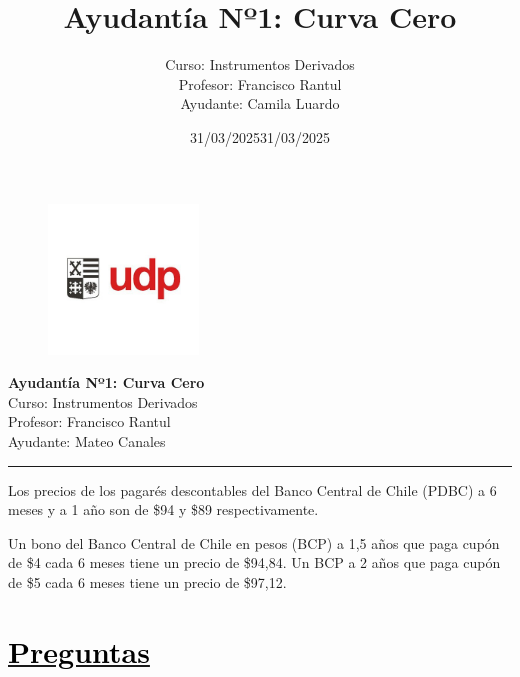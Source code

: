 \documentclass[12pt]{article}
\title{Ayudantía Nº1: Curva Cero}
\author{Curso: Instrumentos Derivados\\
Profesor: Francisco Rantul\\
Ayudante: Camila Luardo}
\date{31/03/2025}
\newcommand{\subrayadoRojo}[1]{{\color{rojoudp}\underline{\textcolor{black}{#1}}}}
\begin{document}
\begin{figure}
    \vspace{-5em}    
    \flushright
    \includegraphics[height=4cm]{../imagenes/logo.png}\\[-3em]
\end{figure}
\begin{center}
    {\LARGE \textbf{Ayudantía Nº1: Curva Cero}}\\[0.5em]
    Curso: Instrumentos Derivados\\
    Profesor: Francisco Rantul\\
    Ayudante: Mateo Canales\\
    \date{31/03/2025}
\end{center}
\vspace{1pt}
{\color{rojoudp}\hrule height 2pt}
\vspace{10pt}

Los precios de los pagarés descontables del Banco Central de Chile (PDBC)
 a 6 meses y a 1 año son de \$94 y \$89 respectivamente. 
  
 Un bono del Banco Central de Chile en pesos (BCP) a 1,5 años que paga cupón de 
 \$4 cada 6 meses tiene un precio de \$94{,}84. Un BCP a 2 años que paga
 cupón de \$5 cada 6 meses tiene un precio de \$97{,}12.

\section*{\subrayadoRojo{Preguntas}}
\end{document}

